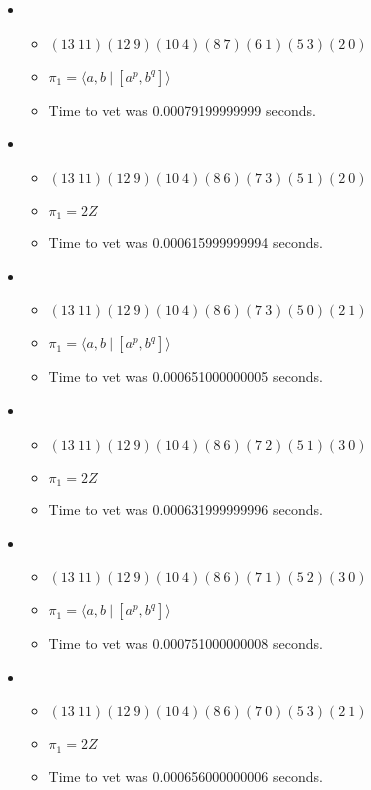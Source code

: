 \documentclass{article}
\begin{document}
\begin{itemize}
\begin{itemize}
\end{itemize}
\item \begin{itemize}
      \item $(13\ 11)(12\ 9)(10\ 4)(8\ 7)(6\ 1)(5\ 3)(2\ 0)$
      \item $\pi_1 = \langle a,b\ |\ [a^p,b^q]\rangle$
      \item Time to vet was 0.00079199999999 seconds.
\end{itemize}
\item \begin{itemize}
      \item $(13\ 11)(12\ 9)(10\ 4)(8\ 6)(7\ 3)(5\ 1)(2\ 0)$
      \item $\pi_1 =2 Z$
      \item Time to vet was 0.000615999999994 seconds.
\end{itemize}
\item \begin{itemize}
      \item $(13\ 11)(12\ 9)(10\ 4)(8\ 6)(7\ 3)(5\ 0)(2\ 1)$
      \item $\pi_1 = \langle a,b\ |\ [a^p,b^q]\rangle$
      \item Time to vet was 0.000651000000005 seconds.
\end{itemize}
\item \begin{itemize}
      \item $(13\ 11)(12\ 9)(10\ 4)(8\ 6)(7\ 2)(5\ 1)(3\ 0)$
      \item $\pi_1 =2 Z$
      \item Time to vet was 0.000631999999996 seconds.
\end{itemize}
\item \begin{itemize}
      \item $(13\ 11)(12\ 9)(10\ 4)(8\ 6)(7\ 1)(5\ 2)(3\ 0)$
      \item $\pi_1 = \langle a,b\ |\ [a^p,b^q]\rangle$
      \item Time to vet was 0.000751000000008 seconds.
\end{itemize}
\item \begin{itemize}
      \item $(13\ 11)(12\ 9)(10\ 4)(8\ 6)(7\ 0)(5\ 3)(2\ 1)$
      \item $\pi_1 =2 Z$
      \item Time to vet was 0.000656000000006 seconds.
\end{itemize}

\end{itemize}
\end{document}
